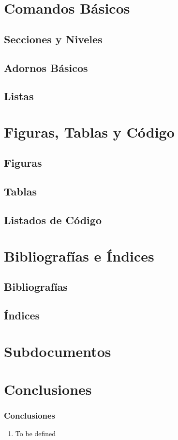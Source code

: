 \documentclass[a4paper,slidestop,xcolor=pst,dvips,blue]{beamer}
\begin{document}
\section{Comandos Básicos}

\subsection{Secciones y Niveles}

\subsection{Adornos Básicos}

\subsection{Listas}

\section{Figuras, Tablas y Código}

\subsection{Figuras}

\subsection{Tablas}

\subsection{Listados de Código}

\section{Bibliografías e Índices}

\subsection{Bibliografías}

\subsection{Índices}

\section{Subdocumentos}

\section{Conclusiones}

\begin{frame}[c]
	\frametitle{Conclusiones}
	\begin{enumerate}[<+->]
		\item To be defined
	\end{enumerate}
\end{frame}

%    
%    
\end{document}
